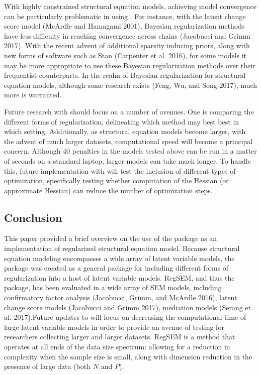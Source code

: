 \documentclass[article]{jss}
\begin{document}
With highly constrained structural equation models, achieving model
convergence can be particularly problematic in using . For
instance, with the latent change score model (McArdle and Hamagami
2001), Bayesian regularization methods have less difficulty in reaching
convergence across chains (Jacobucci and Grimm 2017). With the recent
advent of additional sparsity inducing priors, along with new forms of
software such as Stan (Carpenter et al. 2016), for some models it may be
more appropriate to use these Bayesian regularization methods over their
frequentist counterparts. In the realm of Bayesian regularization for
structural equation models, although some research exists (Feng, Wu, and
Song 2017), much more is warranted.

Future research with  should focus on a number of avenues.
One is comparing the different forms of regularization, delineating
which method may best best in which setting. Additionally, as structural
equation models become larger, with the advent of much larger datasets,
computational speed will become a principal concern. Although 40
penalties in the models tested above can be run in a matter of seconds
on a standard laptop, larger models can take much longer. To handle
this, future implementation with  will test the inclusion of
different types of optimization, specifically testing whether
computation of the Hessian (or approximate Hessian) can reduce the
number of optimization steps.

\subsection{Conclusion}\label{conclusion}

This paper provided a brief overview on the use of the 
package as an implementation of regularized structural equation model.
Because structural equation modeling encompasses a wide array of latent
variable models, the  package was created as a general
package for including different forms of regularization into a host of
latent variable models. RegSEM, and thus the  package, has
been evaluated in a wide array of SEM models, including confirmatory
factor analysis (Jacobucci, Grimm, and McArdle 2016), latent change
score models (Jacobucci and Grimm 2017), mediation models (Serang et al.
2017).Future updates to  will focus on decreasing the
computational time of large latent variable models in order to provide
an avenue of testing for researchers collecting larger and larger
datasets. RegSEM is a method that operates at all ends of the data size
spectrum: allowing for a reduction in complexity when the sample size is
small, along with dimension reduction in the presence of large data
(both \(N\) and \(P\)).
\end{document}
